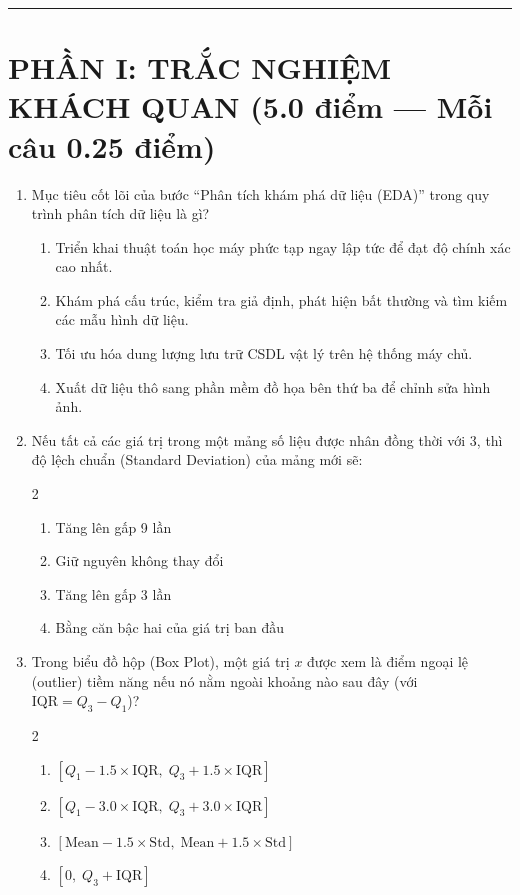 \documentclass[11pt,a4paper]{article}
\begin{document}
\vspace{-3mm}
\hrule
\vspace{1.5mm}

\section*{PHẦN I: TRẮC NGHIỆM KHÁCH QUAN (5.0 điểm --- Mỗi câu 0.25 điểm)}

\begin{enumerate}[leftmargin=*,itemsep=1.5pt]

\item Mục tiêu cốt lõi của bước ``Phân tích khám phá dữ liệu (EDA)'' trong quy trình phân tích dữ liệu là gì?
\begin{enumerate}[label=\Alph*.]
  \item Triển khai thuật toán học máy phức tạp ngay lập tức để đạt độ chính xác cao nhất.
  \item Khám phá cấu trúc, kiểm tra giả định, phát hiện bất thường và tìm kiếm các mẫu hình dữ liệu.
  \item Tối ưu hóa dung lượng lưu trữ CSDL vật lý trên hệ thống máy chủ.
  \item Xuất dữ liệu thô sang phần mềm đồ họa bên thứ ba để chỉnh sửa hình ảnh.
\end{enumerate}

\item Nếu tất cả các giá trị trong một mảng số liệu được nhân đồng thời với 3, thì độ lệch chuẩn (Standard Deviation) của mảng mới sẽ:
\begin{multicols}{2}
\begin{enumerate}[label=\Alph*.]
  \item Tăng lên gấp 9 lần
  \item Giữ nguyên không thay đổi
  \item Tăng lên gấp 3 lần
  \item Bằng căn bậc hai của giá trị ban đầu
\end{enumerate}
\end{multicols}

\item Trong biểu đồ hộp (Box Plot), một giá trị $x$ được xem là điểm ngoại lệ (outlier) tiềm năng nếu nó nằm ngoài khoảng nào sau đây (với $\text{IQR} = Q_3 - Q_1$)?
\begin{multicols}{2}
\begin{enumerate}[label=\Alph*.]
  \item $[Q_1 - 1.5\times\text{IQR}, \; Q_3 + 1.5\times\text{IQR}]$
  \item $[Q_1 - 3.0\times\text{IQR}, \; Q_3 + 3.0\times\text{IQR}]$
  \item $[\text{Mean} - 1.5\times\text{Std}, \; \text{Mean} + 1.5\times\text{Std}]$
  \item $[0, \; Q_3 + \text{IQR}]$
\end{enumerate}
\end{multicols}


\end{enumerate}
\end{document}
